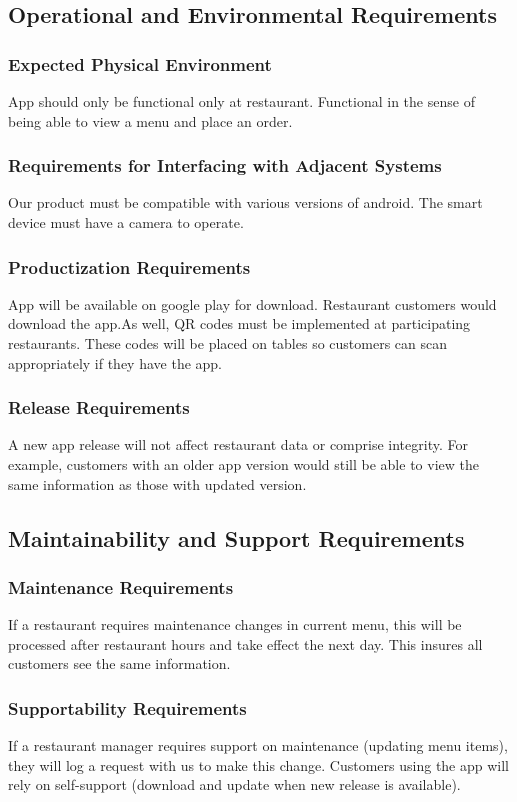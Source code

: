 \documentclass[12pt, titlepage]{article}
\begin{document}
\subsection{Operational and Environmental Requirements}
\subsubsection{Expected Physical Environment}
App should only be functional only at restaurant. Functional in the sense of being able to view a menu and place an order.
\subsubsection{Requirements for Interfacing with Adjacent Systems}
Our product must be compatible with various versions of android. The smart device must have a camera to operate. 
\subsubsection{Productization Requirements}
App will be available on google play for download. Restaurant customers would download the app.As well, QR codes must be implemented at participating restaurants. These codes will be placed on tables so customers can scan appropriately if they have the app. 
\subsubsection{Release Requirements}
A new app release will not affect restaurant data or comprise integrity. For example, customers with an older app version would still be able to view the same information as those with updated version. 
\subsection{Maintainability and Support Requirements}
\subsubsection{Maintenance Requirements}
If a restaurant requires maintenance changes in current menu, this will be processed after restaurant hours and take effect the next day. This insures all customers see the same information. 
\subsubsection{Supportability Requirements}
If a restaurant manager requires support on maintenance (updating menu items), they will log a request with us to make this change. Customers using the app will rely on self-support (download and update when new release is available).
\end{document}
